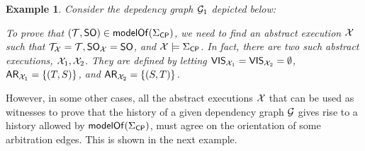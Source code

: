 \documentclass[a4paper,UKenglish]{article}%
\theoremstyle{plain}
\newtheorem{example}[thm]{\sc Example}
\begin{document}
\begin{example}
\label{ex:writeskew}
Consider the depedency graph $\mathcal{G}_1$ depicted below:
\begin{center}
\end{center}
To prove that $(\mathcal{T}, {\sf{SO}}) \in \mathsf{modelOf}(\Sigma_{\mathsf{CP}})$, we need to 
find an abstract execution $\mathcal{X}$ such that $\mathcal{T}_{\mathcal{X}} = \mathcal{T}, {\sf{SO}}_{\mathcal{X}} = {\sf{SO}}$, 
and $\mathcal{X} \models \Sigma_{\mathsf{CP}}$. In fact, there are two such abstract executions, 
$\mathcal{X}_1, \mathcal{X}_2$. They are defined by letting ${\mathsf{VIS}}_{\mathcal{X}_1} = {\mathsf{VIS}}_{\mathcal{X}_2} = \emptyset$,
${\sf{AR}}_{\mathcal{X}_1} = \{(T,S)\}$, and ${\sf{AR}}_{\mathcal{X}_2} = \{(S,T)\}$. 
\end{example}
However, in some other cases, all the abstract executions $\mathcal{X}$ that can be used as witnesses to prove 
that the history of a given dependency graph $\mathcal{G}$ gives rise to a history allowed by $\mathsf{modelOf}(\Sigma_{\mathsf{CP}})$, 
must agree on the orientation of some arbitration edges. This is shown in the next example. 
\end{document}
